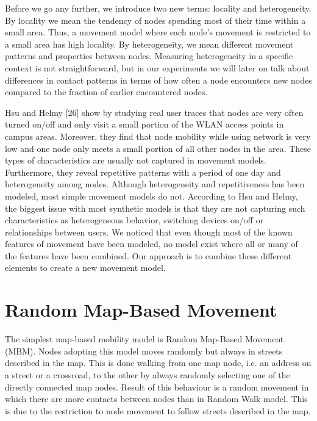 Before we go any further, we introduce two new terms: locality and heterogeneity. By
locality we mean the tendency of nodes spending most of their time within a small area.
Thus, a movement model where each node's movement is restricted to a small area has
high locality. By heterogeneity, we mean different movement patterns and properties
between nodes. Measuring heterogeneity in a specific context is not straightforward,
but in our experiments we will later on talk about differences in contact patterns in
terms of how often a node encounters new nodes compared to the fraction of earlier
encountered nodes.

Hsu and Helmy [26] show by studying real user traces that nodes are very often turned
on/off and only visit a small portion of the WLAN access points in campus areas.
Moreover, they find that node mobility while using network is very low and one node
only meets a small portion of all other nodes in the area. These types of characteristics
are usually not captured in movement models. Furthermore, they reveal repetitive
patterns with a period of one day and heterogeneity among nodes. Although
heterogeneity and repetitiveness has been modeled, most simple movement models do
not. According to Hsu and Helmy, the biggest issue with most synthetic models is that
they are not capturing such characteristics as heterogeneous behavior, switching
devices on/off or relationships between users.
We noticed that even though most of the known features of movement have been
modeled, no model exist where all or many of the features have been combined. Our
approach is to combine these different elements to create a new movement model.



\section{Random Map-Based Movement}
The simplest map-based mobility model is Random Map-Based Movement (MBM). Nodes adopting this model moves randomly but always in streets described in the map. This is done walking from one map node, i.e. an address on a street or a crossroad, to the other by always randomly selecting one of the directly connected map nodes. Result of this behaviour is a random movement in which there are more contacts between nodes than in Random Walk model. This is due to the restriction to node movement to follow streets described in the map.


